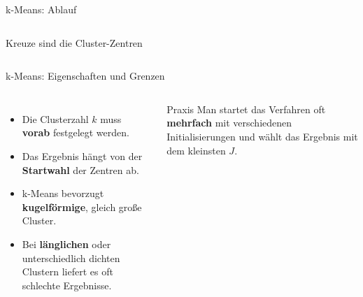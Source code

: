 \begin{frame}{k-Means: Ablauf}
\begin{columns}
{%
}

\vspace{0.3em}
{\scriptsize Kreuze sind die Cluster-Zentren}

\end{columns}
\end{frame}





\begin{frame}{k-Means: Eigenschaften und Grenzen}
\begin{columns}
\begin{itemize}
  \item Die Clusterzahl $k$ muss \textbf{vorab} festgelegt werden.
  \item Das Ergebnis hängt von der \textbf{Startwahl} der Zentren ab.
  \item k-Means bevorzugt \textbf{kugelförmige}, gleich große Cluster.
  \item Bei \textbf{länglichen} oder unterschiedlich dichten Clustern
        liefert es oft schlechte Ergebnisse.
\end{itemize}

\begin{blockC2}{Praxis}
Man startet das Verfahren oft \textbf{mehrfach} mit verschiedenen
Initialisierungen und wählt das Ergebnis mit dem kleinsten $J$.
\end{blockC2}
\end{columns}
\end{frame}


